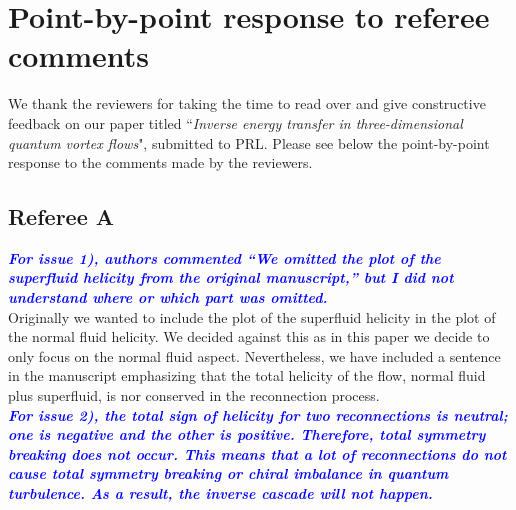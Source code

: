 \documentclass[a4paper,10pt]{article}
\def\blue#1{\textcolor{blue}{#1}}
\def\refcomment#1{\textbf{\blue{\emph{#1}}}\\}
\newcommand*{\CHANGE}[1]{{\color{magenta}#1}}
\begin{document}
\section*{\centering Point-by-point response to referee comments}

We thank the reviewers for taking the time to read over and give constructive feedback on our paper titled “\emph{Inverse energy transfer in three-dimensional quantum vortex flows}", submitted to PRL. Please see below the point-by-point response to the comments made by the reviewers.

\subsection*{Referee A}

\refcomment{For issue 1), authors
commented “We omitted the plot of the superfluid helicity from the
original manuscript,” but I did not understand where or which part was
omitted.}

Originally we wanted to include the plot of the superfluid helicity in the plot of the normal fluid helicity. We decided against this as in this paper we decide to only focus on the normal fluid aspect. \CHANGE{Nevertheless, we have included a sentence in the manuscript emphasizing that the total helicity of the flow, normal fluid plus superfluid, is nor conserved in the reconnection process.}\\   

\refcomment{For issue 2), the total sign of helicity for two
reconnections is neutral; one is negative and the other is positive.
Therefore, total symmetry breaking does not occur. This means that a
lot of reconnections do not cause total symmetry breaking or chiral
imbalance in quantum turbulence. As a result, the inverse cascade will
not happen.}

\end{document}
